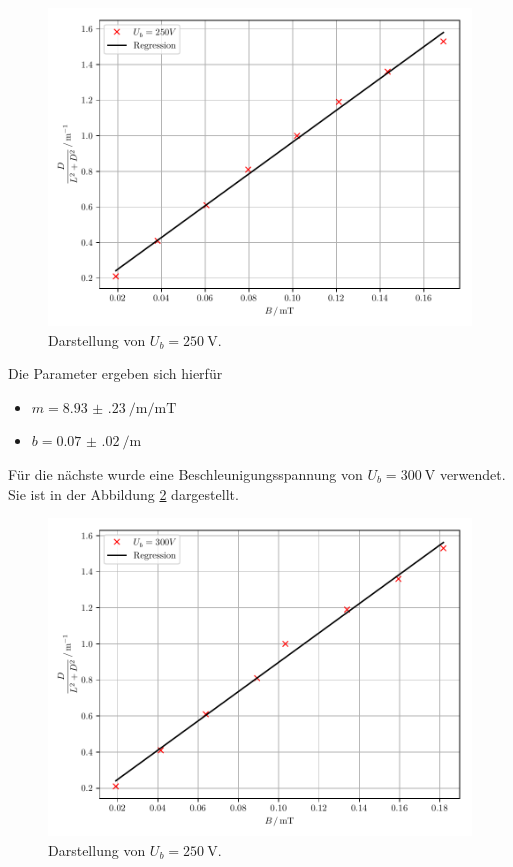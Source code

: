 \begin{figure}[H]
  \centering
  \includegraphics{plot7.pdf}
  \caption{Darstellung von $U_b=\SI{250}{\volt}$.}
  \label{abb:12}
\end{figure}
Die Parameter ergeben sich hierfür
\begin{itemize}
  \item $m = \SI[per-mode=fraction]{8.93(23)}{\per\meter\per\milli\tesla}$
  \item $b =\SI[per-mode=fraction]{0.07(02)}{\per\meter}$
\end{itemize}
Für die nächste wurde eine Beschleunigungsspannung von $U_b = \SI{300}{\volt}$ verwendet.
Sie ist in der Abbildung \ref{abb:13} dargestellt.
\begin{figure}[H]
  \centering
  \includegraphics{plot8.pdf}
  \caption{Darstellung von $U_b=\SI{250}{\volt}$.}
  \label{abb:13}
\end{figure}
